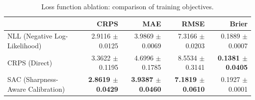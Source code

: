 \begin{table}[htbp]
  \centering
  \caption{Loss function ablation: comparison of training objectives.}
  \label{tab:loss_ablation}
  \begin{tabular}{l r r r r}
    \toprule
     & \textbf{CRPS} & \textbf{MAE} & \textbf{RMSE} & \textbf{Brier} \\
    \midrule
    NLL (Negative Log-Likelihood) & 2.9116 $\pm$ 0.0125 & 3.9869 $\pm$ 0.0069 & 7.3166 $\pm$ 0.0203 & 0.1889 $\pm$ 0.0007 \\
    CRPS (Direct) & 3.3622 $\pm$ 0.1195 & 4.6996 $\pm$ 0.1785 & 8.5534 $\pm$ 0.3141 & \textbf{0.1381 $\pm$ 0.0405} \\
    SAC (Sharpness-Aware Calibration) & \textbf{2.8619 $\pm$ 0.0429} & \textbf{3.9387 $\pm$ 0.0460} & \textbf{7.1819 $\pm$ 0.0610} & 0.1927 $\pm$ 0.0001 \\
    \bottomrule
  \end{tabular}
\end{table}
